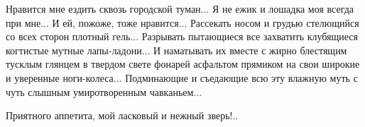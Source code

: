 
Нравится мне ездить сквозь городской туман... Я не ежик и лошадка моя всегда при
мне... И ей, пожоже, тоже нравится... Рассекать носом и грудью стелющийся со всех
сторон плотный гель... Разрывать пытающиеся все захватить клубящиеся когтистые
мутные лапы-ладони... И наматывать их вместе с жирно блестящим тусклым глянцем в
твердом свете фонарей асфальтом прямиком на свои широкие и уверенные
ноги-колеса... Подминающие и съедающие всю эту влажную муть с чуть слышным
умиротворенным чавканьем...

Приятного аппетита, мой ласковый и нежный зверь!..

